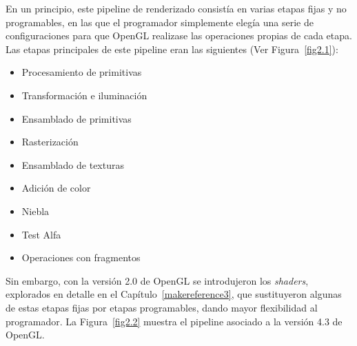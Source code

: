 En un principio, este pipeline de renderizado consistía en varias etapas fijas y
no programables, en las que el programador simplemente elegía una serie de
configuraciones para que OpenGL realizase las operaciones propias de cada etapa.
Las etapas principales de este pipeline eran las siguientes (Ver
Figura~\ref{fig2.1}):

\begin{itemize}
		\item Procesamiento de primitivas
		\item Transformación e iluminación
		\item Ensamblado de primitivas
		\item Rasterización
		\item Ensamblado de texturas
		\item Adición de color
		\item Niebla
		\item Test Alfa
		\item Operaciones con fragmentos
\end{itemize}

Sin embargo, con la versión 2.0 de OpenGL se introdujeron los \textit{shaders},
explorados en detalle en el Capítulo~\ref{makereference3}, que sustituyeron
algunas de estas etapas fijas por etapas programables, dando mayor flexibilidad
al programador. La Figura~\ref{fig2.2} muestra el pipeline asociado a la versión
4.3 de OpenGL. \\

